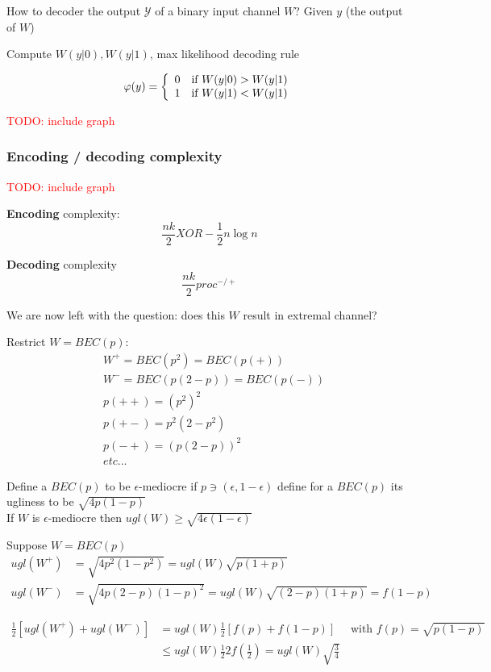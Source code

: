 \documentclass[twoside]{article}
\theoremstyle{definition} %
\newcommand{\todo}[1]{\textcolor{red}{TODO: #1}}
\def\Y{\mathcal{Y}}
\begin{document}

How to decoder the output $\Y$ of a binary input channel $W$? Given $y$ (the output of $W$)

Compute $W(y|0), W(y|1)$, max likelihood decoding rule

\[
\varphi(y) =
\left\{
\begin{array}{c c}
  0 & \text{if } W(y|0) > W(y|1) \\
  1 & \text{if } W(y|1) < W(y|1) \\
\end{array}
\right.
\]

\todo{include graph}

\subsubsection*{Encoding / decoding complexity}

\todo{include graph}

\textbf{Encoding} complexity:
\[
  \frac{nk}{2} XOR - \frac{1}{2} n \log n
\]

\textbf{Decoding} complexity
\[
  \frac{nk}{2} proc^{-/+}
\]

We are now left with the question: does this $W$ result in extremal channel?

Restrict $W = BEC(p)$:
\begin{align*}
  & W^+ = BEC(p^2) = BEC(p(+)) \\
  & W^- = BEC(p(2-p)) = BEC(p(-)) \\
  & p(++) = (p^2)^2 \\
  & p(+-) = p^2 (2 - p^2) \\
  & p(-+) = (p(2-p))^2 \\
  & etc...
\end{align*}

Define a $BEC(p)$ to be $\epsilon$-mediocre if $p \ni (\epsilon, 1-\epsilon)$ define for a $BEC(p)$ its ugliness to be $\sqrt{4 p(1-p)}$ \\
If $W$ is $\epsilon$-mediocre then $ugl(W) \geq \sqrt{4 \epsilon ( 1 - \epsilon)}$

Suppose $W = BEC(p)$
\begin{align*}
  ugl(W^+) &= \sqrt{4 p^2 (1-p^2)}    = ugl(W) \sqrt{p (1+p)} \\
  ugl(W^-) &= \sqrt{4 p (2-p)(1-p)^2} = ugl(W) \sqrt{(2-p)(1+p)} = f(1-p)
\end{align*}

\begin{align*}
  \frac{1}{2} [ugl(W^+) + ugl(W^-)] &= ugl(W) \frac{1}{2} [f(p) + f(1-p)] \quad \text{ with } f(p) = \sqrt{p(1-p)} \\
    &\leq ugl(W) \frac{1}{2} 2 f(\frac{1}{2}) = ugl(W) \sqrt{\frac{3}{4}}
\end{align*}
\end{document}

